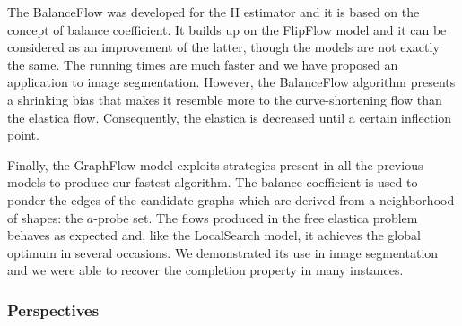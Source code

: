 The BalanceFlow was developed for the II estimator and it is based on the concept of balance coefficient. It builds up on the FlipFlow model and it can be considered as an improvement of the latter, though the models are not exactly the same. The running times are much faster and we have proposed an application to image segmentation. However, the BalanceFlow algorithm presents a shrinking bias that makes it resemble more to the curve-shortening flow than the elastica flow. Consequently, the elastica is decreased until a certain inflection point.

Finally, the GraphFlow model exploits strategies present in all the previous models to produce our fastest algorithm. The balance coefficient is used to ponder the edges of the candidate graphs which are derived from a neighborhood of shapes: the $a$-probe set. The flows produced in the free elastica problem behaves as expected and, like the LocalSearch model, it achieves the global optimum in several occasions. We demonstrated its use in image segmentation and we were able to recover the completion property in many instances.

\subsubsection{Perspectives}

